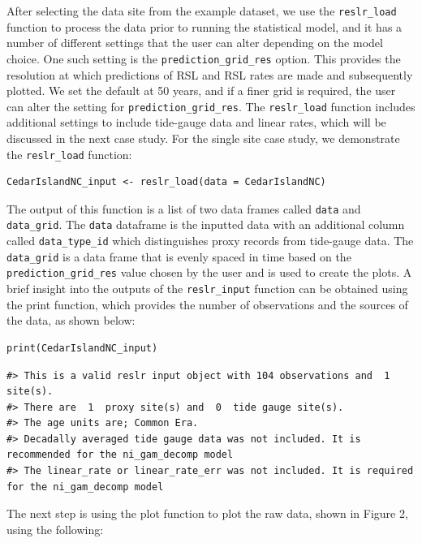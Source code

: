 After selecting the data site from the example dataset, we use the \texttt{reslr\_load} function to process the data prior to running the statistical model, and it has a number of different settings that the user can alter depending on the model choice. One such setting is the \texttt{prediction\_grid\_res} option. This provides the resolution at which predictions of RSL and RSL rates are made and subsequently plotted. We set the default at 50 years, and if a finer grid is required, the user can alter the setting for \texttt{prediction\_grid\_res}. The \texttt{reslr\_load} function includes additional settings to include tide-gauge data and linear rates, which will be discussed in the next case study. For the single site case study, we demonstrate the \texttt{reslr\_load} function:
\scriptsize

\begin{verbatim}
CedarIslandNC_input <- reslr_load(data = CedarIslandNC)
\end{verbatim}

\normalsize

The output of this function is a list of two data frames called \texttt{data} and \texttt{data\_grid}. The \texttt{data} dataframe is the inputted data with an additional column called \texttt{data\_type\_id} which distinguishes proxy records from tide-gauge data. The \texttt{data\_grid} is a data frame that is evenly spaced in time based on the \texttt{prediction\_grid\_res} value chosen by the user and is used to create the plots. A brief insight into the outputs of the \texttt{reslr\_input} function can be obtained using the print function, which provides the number of observations and the sources of the data, as shown below:
\scriptsize

\begin{verbatim}
print(CedarIslandNC_input)
\end{verbatim}

\begin{verbatim}
#> This is a valid reslr input object with 104 observations and  1 site(s).
#> There are  1  proxy site(s) and  0  tide gauge site(s).
#> The age units are; Common Era. 
#> Decadally averaged tide gauge data was not included. It is recommended for the ni_gam_decomp model 
#> The linear_rate or linear_rate_err was not included. It is required for the ni_gam_decomp model
\end{verbatim}

\normalsize

The next step is using the plot function to plot the raw data, shown in Figure 2, using the following:
\scriptsize

